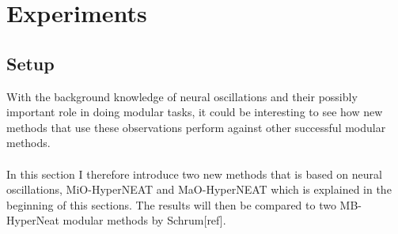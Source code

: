 \documentclass[11pt, a4paper]{article}
\begin{document}
\author{Mads Anthony}
\section{Experiments}
\subsection{Setup}
With the background knowledge of neural oscillations and their possibly important role in doing modular tasks, it could be interesting to see how new methods that use these observations perform against other successful modular methods.
\\
\\
In this section I therefore introduce two new methods that is based on neural oscillations, MiO-HyperNEAT and MaO-HyperNEAT which is explained in the beginning of this sections. The results will then be compared to two MB-HyperNeat modular methods by Schrum[ref].
\end{document}
